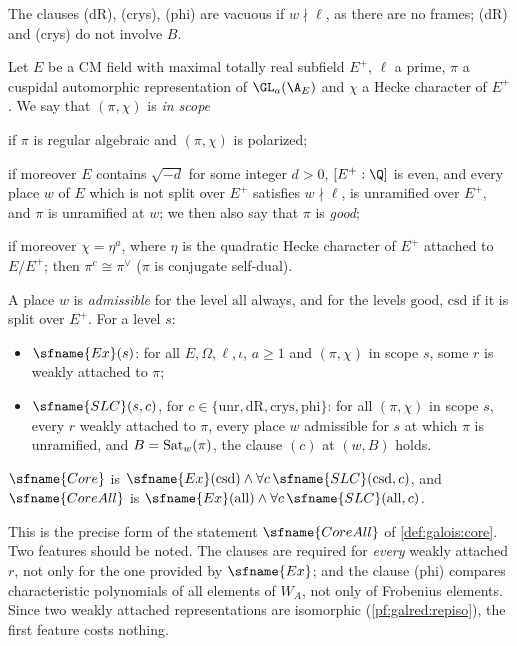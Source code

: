 The clauses (dR), (crys), (phi) are vacuous if $w\nmid\ell$, as there are no frames; (dR) and (crys) do not
involve $B$.

\begin{definition}\label{pf:galred:coreall}
Let $E$ be a CM field with maximal totally real subfield $E^+$, $\ell$ a prime, $\pi$ a cuspidal automorphic
representation of $\GL_a(\A_E)$ and $\chi$ a Hecke character of $E^+$. We say that $(\pi,\chi)$ is \emph{in scope}
\begin{description}[nosep]
\item[$\mathrm{all}$] if $\pi$ is regular algebraic and $(\pi,\chi)$ is polarized;
\item[$\mathrm{good}$] if moreover $E$ contains $\sqrt{-d}$ for some integer $d>0$, $[E^+:\Q]$ is even, and every
  place $w$ of $E$ which is not split over $E^+$ satisfies $w\nmid\ell$, is unramified over $E^+$, and $\pi$ is
  unramified at $w$; we then also say that $\pi$ is \emph{good};
\item[$\mathrm{csd}$] if moreover $\chi=\eta^a$, where $\eta$ is the quadratic Hecke character of $E^+$ attached to
  $E/E^+$; then $\pi^c\cong\pi^\vee$ ($\pi$ is conjugate self-dual).
\end{description}
A place $w$ is \emph{admissible} for the level $\mathrm{all}$ always, and for the levels $\mathrm{good}$,
$\mathrm{csd}$ if it is split over $E^+$. For a level $s$:
\begin{itemize}[nosep]
\item $\sfname{Ex}(s)$: for all $E,\Omega,\ell,\iota$, $a\ge1$ and $(\pi,\chi)$ in scope $s$, some $r$ is weakly
  attached to $\pi$;
\item $\sfname{SLC}(s,c)$, for $c\in\{\mathrm{unr},\mathrm{dR},\mathrm{crys},\mathrm{phi}\}$: for all $(\pi,\chi)$
  in scope $s$, every $r$ weakly attached to $\pi$, every place $w$ admissible for $s$ at which $\pi$ is unramified,
  and $B=\operatorname{Sat}_w(\pi)$, the clause $(c)$ at $(w,B)$ holds.
\end{itemize}
$\sfname{Core}$ is $\sfname{Ex}(\mathrm{csd})\wedge\forall c\,\sfname{SLC}(\mathrm{csd},c)$, and
$\sfname{CoreAll}$ is $\sfname{Ex}(\mathrm{all})\wedge\forall c\,\sfname{SLC}(\mathrm{all},c)$.
\end{definition}

\begin{remark}\label{pf:galred:coreallrem}
This is the precise form of the statement $\sfname{CoreAll}$ of \cref{def:galois:core}. Two features should be
noted. The clauses are required for \emph{every} weakly attached $r$, not only for the one provided by
$\sfname{Ex}$; and the clause (phi) compares characteristic polynomials of all elements of $W_A$, not only of
Frobenius elements. Since two weakly attached representations are isomorphic (\cref{pf:galred:repiso}), the
first feature costs nothing.
\end{remark}

